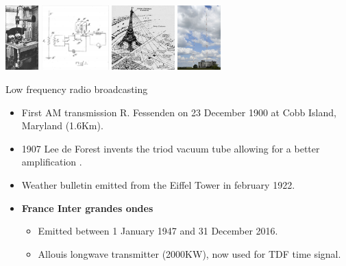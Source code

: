 \begin{center}
  \includegraphics[height=2.5cm]{imgs/fourier/Telefunken_arc_radiotelephone.jpg}
  \includegraphics[height=2.5cm]{imgs/fourier/triode.png}
  \includegraphics[height=2.5cm]{imgs/fourier/eiffel_antena.jpeg}
  \includegraphics[height=2.5cm]{imgs/fourier/Emetteur-allouis3.jpg}
\end{center}

\begin{block}{Low frequency radio broadcasting}\vspace{-2mm}
  \begin{itemize}
    \item First AM transmission R. Fessenden on 23 December 1900 at  Cobb Island, Maryland (1.6Km).
    \item 1907 Lee de Forest invents the triod vacuum tube allowing for a better amplification \cite{de1908space}.
    \item Weather bulletin emitted from the Eiffel Tower in february 1922. 
    \item \textbf{France Inter grandes ondes}
    \begin{itemize}
      \item Emitted between 1 January 1947 and 31 December 2016.
      \item Allouis longwave transmitter (2000KW), now used for TDF time signal.
    \end{itemize}
  \end{itemize}
\end{block}


